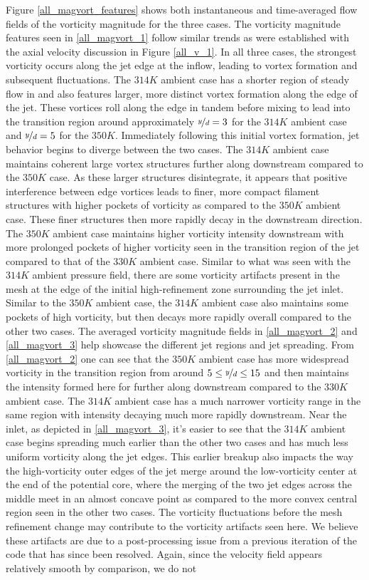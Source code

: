 Figure \ref{all_magvort_features} shows both instantaneous and time-averaged flow fields of the vorticity magnitude for the three cases. The vorticity magnitude features seen in \ref{all_magvort_1} follow similar trends as were established with the axial velocity discussion in Figure \ref{all_v_1}. In all three cases, the strongest vorticity occurs along the jet edge at the inflow, leading to vortex formation and subsequent fluctuations. The $314 K$ ambient case has a shorter region of steady flow in and also features larger, more distinct vortex formation along the edge of the jet. These vortices roll along the edge in tandem before mixing to lead into the transition region around approximately $\nicefrac{y}{d} = 3$ for the $314 K$ ambient case and $\nicefrac{y}{d} = 5$ for the $350 K$. Immediately following this initial vortex formation, jet behavior begins to diverge between the two cases. The $314 K$ ambient case maintains coherent large vortex structures further along downstream compared to the $350 K$ case. As these larger structures disintegrate, it appears that positive interference between edge vortices leads to finer, more compact filament structures with higher pockets of vorticity as compared to the $350 K$ ambient case. These finer structures then more rapidly decay in the downstream direction. The $350 K$ ambient case maintains higher vorticity intensity downstream with more prolonged pockets of higher vorticity seen in the transition region of the jet compared to that of the $330 K$ ambient case. Similar to what was seen with the $314 K$ ambient pressure field, there are some vorticity artifacts present in the mesh at the edge of the initial high-refinement zone surrounding the jet inlet. Similar to the $350 K$ ambient case, the $314 K$ ambient case also maintains some pockets of high vorticity, but then decays more rapidly overall compared to the other two cases. The averaged vorticity magnitude fields in \ref{all_magvort_2} and \ref{all_magvort_3} help showcase the different jet regions and jet spreading. From \ref{all_magvort_2} one can see that the $350 K$ ambient case has more widespread vorticity in the transition region from around $5 \leq \nicefrac{y}{d} \leq 15$ and then maintains the intensity formed here for further along downstream compared to the $330 K$ ambient case. The $314 K$ ambient case has a much narrower vorticity range in the same region with intensity decaying much more rapidly downstream. Near the inlet, as depicted in \ref{all_magvort_3}, it's easier to see that the $314 K$ ambient case begins spreading much earlier than the other two cases and has much less uniform vorticity along the jet edges. This earlier breakup also impacts the way the high-vorticity outer edges of the jet merge around the low-vorticity center at the end of the potential core, where the merging of the two jet edges across the middle meet in an almost concave point as compared to the more convex central region seen in the other two cases. The vorticity fluctuations before the mesh refinement change may contribute to the vorticity artifacts seen here. We believe these artifacts are due to a post-processing issue from a previous iteration of the code that has since been resolved. Again, since the velocity field appears relatively smooth by comparison, we do not 